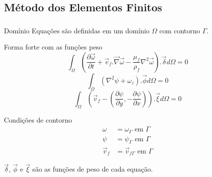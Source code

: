 \documentclass{beamer}
\begin{document}
\subsection{Método dos Elementos Finitos}
\begin{frame}
  \frametitle{\subsecname}
  
  \begin{block}{Domínio}
    Equações são definidas em um domínio $\Omega$ com contorno $\Gamma$.
  \end{block}
    
  \begin{minipage}{.61\textwidth}
    \begin{block}{Forma forte com as funções peso}
      \vspace*{-\baselineskip}\setlength\belowdisplayshortskip{0pt} %
      \begin{equation*}
	\int_{\Omega} \left(
	\dfrac{\partial \vec{\omega}}{\partial t} +
	\vec{v}_f.\vec{\nabla}\vec{\omega} -
	\dfrac{\mu_f}{\rho_f} \nabla^2 \vec{\omega}
	\right).\vec{\delta} d\Omega = 0
      \end{equation*}
      \vspace*{-\baselineskip}\setlength\belowdisplayshortskip{3pt} %
      \vspace{5pt}
      \begin{equation*}
	\int_{\Omega} \left(
	\nabla^2\psi +
	\omega_z
	\right).\vec{\phi} d\Omega = 0
      \end{equation*}
      \vspace{3pt}
      \begin{equation*}
	\int_{\Omega} \left(
	\vec{v}_f - \left(\dfrac{\partial \psi}{\partial y},
	-\dfrac{\partial \psi}{\partial x} \right)
	\right).\vec{\xi} d\Omega = 0
      \end{equation*}
    \end{block}
  \end{minipage}
  \hfill
  \begin{minipage}{.34\textwidth}
    \begin{block}{Condições de contorno}
      \vspace*{-\baselineskip}\setlength\belowdisplayshortskip{0pt} %
      \begin{align*}
	\omega &= \omega_{\Gamma} \text{ em } \Gamma \\
	\psi &= \psi_{\Gamma} \text{ em } \Gamma \\
	\vec{v}_f &= \vec{v}_{f\Gamma} \text{ em } \Gamma 
      \end{align*}
    \end{block}
  \end{minipage}
  
  \vspace{5pt}
  $\vec{\delta}$, $\vec{\phi}$ e $\vec{\xi}$ são as funções de peso de cada equação.
\end{frame}
\end{document}
